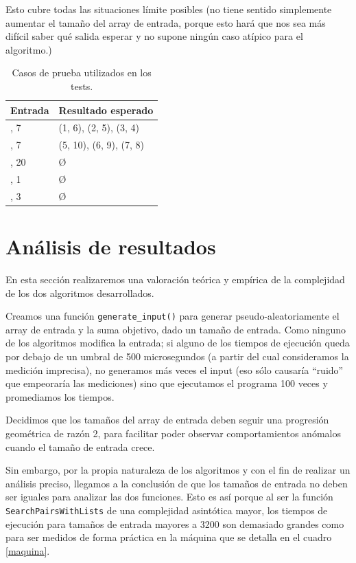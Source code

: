 \documentclass[a4paper, titlepage]{article}
\begin{document}
Esto cubre todas las situaciones límite posibles (no tiene sentido simplemente aumentar el tamaño del array de entrada, porque esto hará que nos sea más difícil saber qué salida esperar y no supone ningún caso atípico para el algoritmo.)


\begin{table}[H]
\centering
\begin{tabular}{|l|l|}
\hline
\textbf{Entrada} & \textbf{Resultado esperado}\\  \hline \hline
[1, 2, 3, 4, 5, 6], 7 &  (1, 6), (2, 5), (3, 4)\\  \hline
[1, 2, 3, \dots, 10], 7 &  (5, 10), (6, 9), (7, 8)\\   \hline
[1, 3, 5], 20 & \O \\   \hline
[1], 1 & \O \\   \hline
[], 3 & \O \\   \hline
\end{tabular}
\caption{Casos de prueba utilizados en los tests.}
\label{pruebas}
\end{table}

\section{Análisis de resultados}

En esta sección realizaremos una valoración teórica y empírica de la complejidad de los dos algoritmos desarrollados.

Creamos una función \texttt{generate\_input()} para generar pseudo-aleatoriamente el array de entrada y la suma objetivo, dado un tamaño de entrada. Como ninguno de los algoritmos modifica la entrada; si alguno de los tiempos de ejecución queda por debajo de un umbral de 500 microsegundos (a partir del cual consideramos la medición imprecisa), no generamos más veces el input (eso sólo causaría ``ruido'' que empeoraría las mediciones) sino que ejecutamos el programa 100 veces y promediamos los tiempos.




Decidimos que los tamaños del array de entrada deben seguir una progresión geométrica de razón 2, para facilitar poder observar comportamientos anómalos cuando el tamaño de entrada crece.

Sin embargo, por la propia naturaleza de los algoritmos y con el fin de realizar un análisis preciso, llegamos a la conclusión de que los tamaños de entrada no  deben ser iguales para analizar las dos funciones. Esto es así porque al ser la función \texttt{SearchPairsWithLists} de una complejidad asintótica mayor, los tiempos de ejecución para tamaños de entrada mayores a 3200 son demasiado grandes como para ser medidos de forma práctica en la máquina que se detalla en el cuadro \ref{maquina}.
\end{document}
